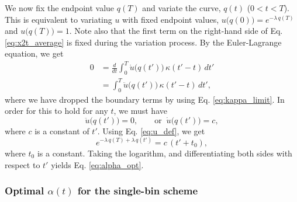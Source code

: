 \documentclass[reprint, floatfix]{revtex4-1}
\begin{document}
We now fix the endpoint value $q(T)$
and variate the curve, $q(t)$ ($0 < t < T$).
%
This is equivalent to variating $u$
with fixed endpoint values,
$u\bigl( q(0) \bigr)  = e^{-\lambda \, q(T)}$
and
$u\bigl( q(T) \bigr) = 1$.
%
Note also that the first term on the right-hand side
of Eq. \eqref{eq:x2t_average} is fixed during
the variation process.
%
%
By the Euler-Lagrange equation, we get
$$
\begin{aligned}
0
&=
\frac{d}{dt} \int_0^T
  \dot u\bigl( q(t') \bigr) \, \kappa(t' - t) \, dt'
\\
&= \int_0^T
  \ddot u\bigl( q(t') \bigr) \, \kappa(t' - t) \, dt',
\end{aligned}
$$
where we have dropped the boundary terms
by using Eq. \eqref{eq:kappa_limit}.
%
%
In order for this to hold for any $t$,
we must have
%
\begin{equation}
\ddot u\bigl( q(t') \bigr) = 0,
\qquad
\mathrm{or}
\;\;
\dot u\bigl( q(t') \bigr) = c,
\label{eq:ddu_eq_0}
\end{equation}
%
where $c$ is a constant of $t'$.
%
Using Eq. \eqref{eq:u_def},
we get
$$
e^{-\lambda \, q(T) + \lambda \, q(t')}
=
c \, (t' + t_0),
$$
where $t_0$ is a constant.
%
Taking the logarithm,
and differentiating both sides
with respect to $t'$
yields Eq. \eqref{eq:alpha_opt}.



\subsubsection{Optimal $\alpha(t)$ for the single-bin scheme}
\end{document}
